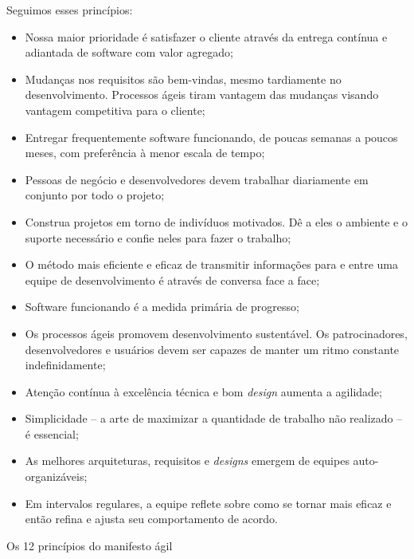 \begin{caixa}[htb]
  \begin{minipage}{\linewidth}
    \centering Seguimos esses princípios:

    \begin{itemize}
    \item Nossa maior prioridade é satisfazer o cliente através da
      entrega contínua e adiantada de software com valor agregado;
    \item Mudanças nos requisitos são bem-vindas, mesmo tardiamente no
      desenvolvimento.  Processos ágeis tiram vantagem das mudanças
      visando vantagem competitiva para o cliente;
    \item Entregar frequentemente software funcionando, de poucas
      semanas a poucos meses, com preferência à menor escala de tempo;
    \item Pessoas de negócio e desenvolvedores devem trabalhar
      diariamente em conjunto por todo o projeto;
    \item Construa projetos em torno de indivíduos motivados.  Dê a
      eles o ambiente e o suporte necessário e confie neles para fazer
      o trabalho;
    \item O método mais eficiente e eficaz de transmitir informações
      para e entre uma equipe de desenvolvimento é através de conversa
      face a face;
    \item Software funcionando é a medida primária de progresso;
    \item Os processos ágeis promovem desenvolvimento sustentável. Os
      patrocinadores, desenvolvedores e usuários devem ser capazes de
      manter um ritmo constante indefinidamente;
    \item Atenção contínua à excelência técnica e bom \textit{design}
      aumenta a agilidade;
    \item Simplicidade -- a arte de maximizar a quantidade de trabalho
      não realizado -- é essencial;
    \item As melhores arquiteturas, requisitos e \textit{designs}
      emergem de equipes auto-organizáveis;
    \item Em intervalos regulares, a equipe reflete sobre como se
      tornar mais eficaz e então refina e ajusta seu comportamento de
      acordo.
    \end{itemize}
  \end{minipage}
  \caption{Os 12 princípios do manifesto ágil}
  \label{box:principles}
\end{caixa}

